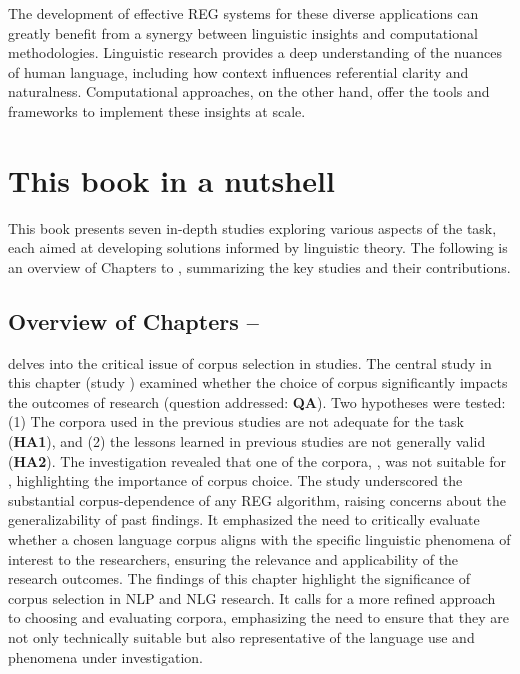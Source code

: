 The development of effective REG systems for these diverse applications can greatly benefit from a synergy between linguistic insights and computational methodologies. Linguistic research provides a deep understanding of the nuances of human language, including how context influences referential clarity and naturalness. Computational approaches, on the other hand, offer the tools and frameworks to implement these insights at scale.

\section{This book in a nutshell} \label{sec:contrib_chap8}
This book presents seven in-depth studies exploring various aspects of the \context task, each aimed at developing solutions informed by linguistic theory. The following is an overview of Chapters \4 to \7, summarizing the key studies and their contributions.

\subsection{Overview of Chapters \4--\7}

  delves into the critical issue of corpus selection in \context studies. The central study in this chapter (study \studA) examined whether the choice of corpus significantly impacts the outcomes of \context research (question addressed: \textbf{QA}). Two hypotheses were tested: (1) The corpora used in the previous \context studies are not adequate for the task (\textbf{HA1}), and (2) the lessons learned in previous \context studies are not generally valid (\textbf{HA2}). The investigation revealed that one of the corpora, \grecp, was not suitable for \context, highlighting the importance of corpus choice. The study underscored the substantial corpus-dependence of any REG algorithm, raising concerns about the generalizability of past findings. It emphasized the need to critically evaluate whether a chosen language corpus aligns with the specific linguistic phenomena of interest to the researchers, ensuring the relevance and applicability of the research outcomes. The findings of this chapter highlight the significance of corpus selection in NLP and NLG research. It calls for a more refined approach to choosing and evaluating corpora, emphasizing the need to ensure that they are not only technically suitable but also representative of the language use and phenomena under investigation.
 

